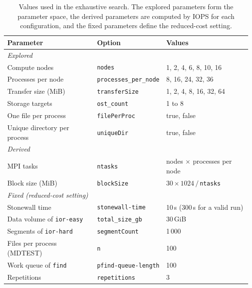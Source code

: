 \begin{table}[H]
\centering
\caption{Values used in the exhaustive search. The explored parameters form
the parameter space, the derived parameters are computed by IOPS for each
configuration, and the fixed parameters define the reduced-cost setting.}
\label{tab:exhaustive-values}
\begin{tabular}{lll}
    \hline
    \rowcolor{gray!30}
    \textbf{Parameter} & \textbf{Option} & \textbf{Values} \\
    \hline
    \multicolumn{3}{l}{\cellcolor{white}\textit{Explored}} \\
    Compute nodes & \texttt{nodes} & 1, 2, 4, 6, 8, 10, 16 \\
    Processes per node & \texttt{processes\_per\_node} & 8, 16, 24, 32, 36 \\
    Transfer size (MiB) & \texttt{transferSize} & 1, 2, 4, 8, 16, 32, 64 \\
    Storage targets & \texttt{ost\_count} & 1 to 8 \\
    One file per process & \texttt{filePerProc} & true, false \\
    Unique directory per process & \texttt{uniqueDir} & true, false \\
    \hline
    \multicolumn{3}{l}{\cellcolor{white}\textit{Derived}} \\
    MPI tasks & \texttt{ntasks} & nodes $\times$ processes per node \\
    Block size (MiB) & \texttt{blockSize} & $30 \times 1024\,/\,$\texttt{ntasks} \\
    \hline
    \multicolumn{3}{l}{\cellcolor{white}\textit{Fixed (reduced-cost setting)}} \\
    Stonewall time & \texttt{stonewall-time} & 10\,s (300\,s for a valid run) \\
    Data volume of \texttt{ior-easy} & \texttt{total\_size\_gb} & 30\,GiB \\
    Segments of \texttt{ior-hard} & \texttt{segmentCount} & 1\,000 \\
    Files per process (MDTEST) & \texttt{n} & 100 \\
    Work queue of \texttt{find} & \texttt{pfind-queue-length} & 100 \\
    Repetitions & \texttt{repetitions} & 3 \\
    \hline
\end{tabular}
\end{table}



